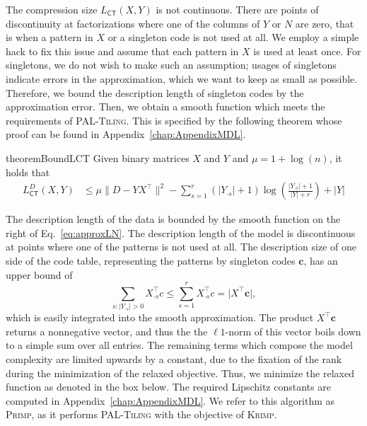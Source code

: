 The compression size $L_{\mathsf{CT}}(X,Y)$ is not continuous. There are points of discontinuity at factorizations where one of the columns of $Y$ or $N$ are zero, that is when a pattern in $X$ or a singleton code is not used at all. We employ a simple hack to fix this issue and assume that each pattern in $X$ is used at least once. For singletons, we do not wish to make such an assumption; usages of singletons indicate errors in the approximation, which we want to keep as small as possible. Therefore, we bound the description length of singleton codes by the approximation error. Then, we obtain a smooth function which meets the requirements of \textsc{PAL-Tiling}. This is specified by the following theorem whose proof can be found in Appendix~\ref{chap:AppendixMDL}. 
\begin{restatable}{theorem}{BoundLCT}\label{thm:bound}
Given binary matrices $X$ and $Y$ and $\mu = 1+\log(n)$, it holds that 
\begin{align} \label{eq:approxLN}
		L^D_{\mathsf{CT}}(X,Y) &\leq \mu \bigl\lVert D-YX^\top \bigr\rVert ^2-\sum_{s=1}^r(\lvert Y_{\cdot s}\rvert +1)\log\left(\frac{\lvert Y_{\cdot s}\rvert +1}{\lvert Y\rvert +r}\right)+\lvert Y\rvert 
\end{align} 
\end{restatable}
The description length of the data is bounded by the smooth function on the right of Eq.~\eqref{eq:approxLN}. The description length of the model is discontinuous at points where one of the patterns is not used at all. The description size of one side of the code table, representing the patterns by singleton codes $\mathbf{c}$, has an upper bound of 
\[\sum_{s:\lvert Y_{\cdot s}\rvert >0}X_{\cdot s}^\top c\leq\sum_{s=1}^rX_{\cdot s}^\top c=\bigl \lvert X^\top \mathbf{c}\bigr \rvert ,\] 
which is easily integrated into the smooth approximation. The product $X^\top \mathbf{c}$ returns a nonnegative vector, and thus the the $\ell 1$-norm of this vector boils down to a simple sum over all entries. 
The remaining terms which compose the model complexity are limited upwards by a constant, due to the fixation of the rank during the minimization of the relaxed objective.
Thus, we minimize the relaxed function as denoted in the box below. 
The required Lipschitz constants are computed in Appendix~\ref{chap:AppendixMDL}. We refer to this algorithm as \textsc{Primp}, as it performs \textsc{PAL-Tiling} with the objective of \textsc{Krimp}.   


